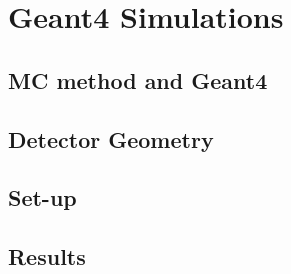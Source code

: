 \chapter{Geant4 Simulations}
\label{chap:Simu}

\section{MC method and Geant4}
\section{Detector Geometry}
\section{Set-up}
\section{Results}
